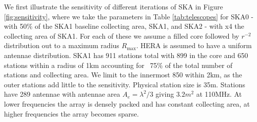 \documentclass{PoS}
\begin{document}
We first illustrate the sensitivity of different iterations of SKA in Figure \ref{fig:sensitivity}, where we take the parameters in Table \ref{tab:telescopes} for SKA0 - with 50\% of the SKA1 baseline collecting area, SKA1, and SKA2 - with x4 the collecting area of SKA1. For each of these we assume a filled core followed by $r^{-2}$ distribution out to a maximum radius $R_{\max}$. HERA is assumed to have a uniform antennae distribution. SKA1 has 911 stations total with 899 in the core and 650 stations within a radius of 1km accounting for ~75\% of the total number of stations and collecting area. We limit to the innermost 850 within 2km, as the outer stations add little to the sensitivity. Physical station size is 35m. Stations have 289 antennae with antennae area $A_e=\lambda^2/3$ giving $3.2m^2$ at 110MHz. At lower frequencies the array is densely packed and has constant collecting area, at higher frequencies the array becomes sparse.
\end{document}
